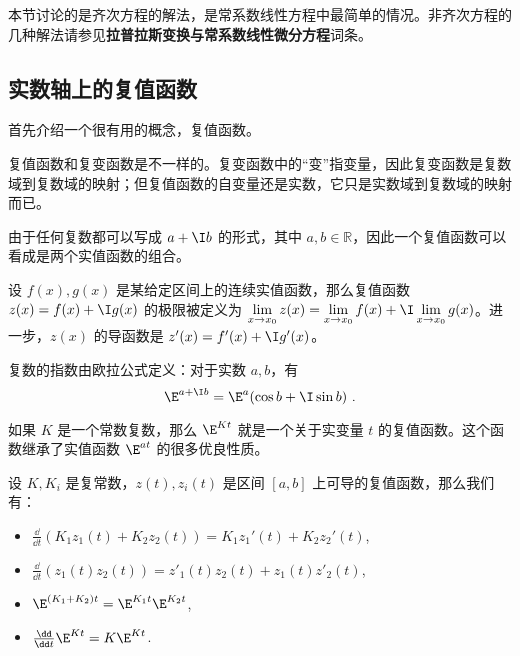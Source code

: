 

本节讨论的是齐次方程的解法，是常系数线性方程中最简单的情况。非齐次方程的几种解法请参见\textbf{拉普拉斯变换与常系数线性微分方程}词条。


\subsection{实数轴上的复值函数}

首先介绍一个很有用的概念，复值函数。

复值函数和复变函数是不一样的。复变函数中的“变”指变量，因此复变函数是复数域到复数域的映射；但复值函数的自变量还是实数，它只是实数域到复数域的映射而已。

由于任何复数都可以写成 $a+\I b$ 的形式，其中 $a, b\in\mathbb{R}$，因此一个复值函数可以看成是两个实值函数的组合。

设 $f(x), g(x)$ 是某给定区间上的连续实值函数，那么复值函数 $z(x)=f(x)+\I g(x)$ 的极限被定义为 $\lim\limits_{x\to x_0}z(x)=\lim\limits_{x\to x_0}f(x)+\I\lim\limits_{x\to x_0}g(x)$。进一步，$z(x)$ 的导函数是 $z'(x)=f'(x)+\I g'(x)$。

复数的指数由欧拉公式定义：对于实数 $a, b$，有
\begin{equation}
\E^{a+\I b}=\E^a(\cos b+\I\sin b)~.
\end{equation}

如果 $K$ 是一个常数复数，那么 $\E^{Kt}$ 就是一个关于实变量 $t$ 的复值函数。这个函数继承了实值函数 $\E^{at}$ 的很多优良性质。

\begin{theorem}{}
设 $K, K_i$ 是复常数，$z(t), z_i(t)$ 是区间 $[a, b]$ 上可导的复值函数，那么我们有：
\begin{itemize}
\item $\frac{\dd }{\dd t}(K_1z_1(t)+K_2z_2(t))=K_1z_1'(t)+K_2z_2'(t)$,
\item $\frac{\dd}{\dd t}(z_1(t)z_2(t))=z'_1(t)z_2(t)+z_1(t)z'_2(t)$,
\item $\E^{(K_1+K_2)t}=\E^{K_1t}\E^{K_2t}$,
\item $\frac{\dd }{\dd t}\E^{Kt}=K\E^{Kt}$.
\end{itemize}
\end{theorem}

